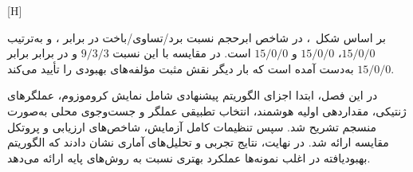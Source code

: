 [H]

بر اساس شکل~، در شاخص ابرحجم نسبت
برد/تساوی/باخت  در برابر ،
 و  به‌ترتیب
$15/0/0$، $15/0/0$ و $15/0/0$ است.
در مقایسه با  این نسبت $9/3/3$ و در برابر
 برابر $15/0/0$ به‌دست آمده است
که بار دیگر نقش مثبت مؤلفه‌های بهبودی را تأیید می‌کند.



در این فصل، ابتدا اجزای الگوریتم پیشنهادی شامل نمایش کروموزوم، عملگرهای ژنتیکی،
مقداردهی اولیه هوشمند، انتخاب تطبیقی عملگر و جست‌وجوی محلی به‌صورت منسجم تشریح شد.
سپس تنظیمات کامل آزمایش، شاخص‌های ارزیابی و پروتکل مقایسه ارائه شد.
در نهایت، نتایج تجربی و تحلیل‌های آماری نشان دادند که الگوریتم بهبودیافته
در اغلب نمونه‌ها عملکرد بهتری نسبت به روش‌های پایه ارائه می‌دهد.
